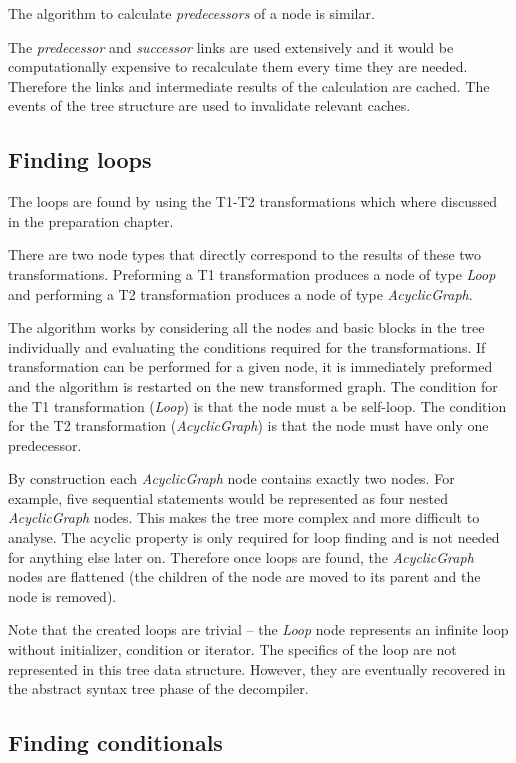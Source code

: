 \documentclass[12pt,twoside,notitlepage]{report}
\begin{document}
The algorithm to calculate \emph{predecessors} of a node is similar.

The \emph{predecessor} and \emph{successor} links are used
extensively and it would be computationally expensive to 
recalculate them every time they are needed.  Therefore the
links and intermediate results of the calculation are cached.
The events of the tree structure are used to invalidate relevant
caches.

\subsection{Finding loops}
     \label{Finding loops}

The loops are found by using the T1-T2 transformations which where
discussed in the preparation chapter.

There are two node types that directly correspond to the results
of these two transformations.  Preforming a T1 transformation
produces a node of type \emph{Loop} and performing a T2 transformation
produces a node of type \emph{AcyclicGraph}.

The algorithm works by considering all the nodes and basic blocks
in the tree individually and evaluating the conditions required for the
transformations.
If transformation can be performed for a given node, it is immediately
preformed and the algorithm is restarted on the new transformed graph.
The condition for the T1 transformation (\emph{Loop}) is that the node
must a be self-loop.  The condition for the T2 transformation
(\emph{AcyclicGraph}) is that the node must have only one predecessor.

By construction each \emph{AcyclicGraph} node contains exactly
two nodes.  For example, five sequential statements would be
represented as four nested \emph{AcyclicGraph} nodes.
This makes the tree more complex and more difficult to analyse.
The acyclic property is only required for loop finding and is not
needed for anything else later on.  Therefore once loops are found,
the \emph{AcyclicGraph} nodes are flattened (the children of the node
are moved to its parent and the node is removed).

Note that the created loops are trivial -- the \emph{Loop} node
represents an infinite loop without initializer, condition or
iterator.  The specifics of the loop are not represented
in this tree data structure.  However, they are eventually
recovered in the abstract syntax tree phase of the decompiler.

\subsection{Finding conditionals}
     \label{Finding conditionals}
\end{document}
